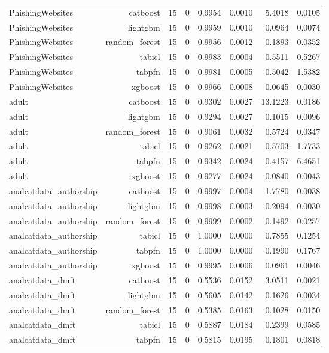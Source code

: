 \begin{table}[htbp]
\begin{tabular}{lrrrrrrr}
PhishingWebsites & catboost & 15 & 0 & 0.9954 & 0.0010 & 5.4018 & 0.0105 \\
PhishingWebsites & lightgbm & 15 & 0 & 0.9959 & 0.0010 & 0.0964 & 0.0074 \\
PhishingWebsites & random\_forest & 15 & 0 & 0.9956 & 0.0012 & 0.1893 & 0.0352 \\
PhishingWebsites & tabicl & 15 & 0 & 0.9983 & 0.0004 & 0.5511 & 0.5267 \\
PhishingWebsites & tabpfn & 15 & 0 & 0.9981 & 0.0005 & 0.5042 & 1.5382 \\
PhishingWebsites & xgboost & 15 & 0 & 0.9966 & 0.0008 & 0.0645 & 0.0030 \\
adult & catboost & 15 & 0 & 0.9302 & 0.0027 & 13.1223 & 0.0186 \\
adult & lightgbm & 15 & 0 & 0.9294 & 0.0027 & 0.1015 & 0.0096 \\
adult & random\_forest & 15 & 0 & 0.9061 & 0.0032 & 0.5724 & 0.0347 \\
adult & tabicl & 15 & 0 & 0.9262 & 0.0021 & 0.5703 & 1.7733 \\
adult & tabpfn & 15 & 0 & 0.9342 & 0.0024 & 0.4157 & 6.4651 \\
adult & xgboost & 15 & 0 & 0.9277 & 0.0024 & 0.0840 & 0.0043 \\
analcatdata\_authorship & catboost & 15 & 0 & 0.9997 & 0.0004 & 1.7780 & 0.0038 \\
analcatdata\_authorship & lightgbm & 15 & 0 & 0.9998 & 0.0003 & 0.2094 & 0.0030 \\
analcatdata\_authorship & random\_forest & 15 & 0 & 0.9999 & 0.0002 & 0.1492 & 0.0257 \\
analcatdata\_authorship & tabicl & 15 & 0 & 1.0000 & 0.0000 & 0.7855 & 0.1254 \\
analcatdata\_authorship & tabpfn & 15 & 0 & 1.0000 & 0.0000 & 0.1990 & 0.1767 \\
analcatdata\_authorship & xgboost & 15 & 0 & 0.9995 & 0.0006 & 0.0961 & 0.0046 \\
analcatdata\_dmft & catboost & 15 & 0 & 0.5536 & 0.0152 & 3.0511 & 0.0021 \\
analcatdata\_dmft & lightgbm & 15 & 0 & 0.5605 & 0.0142 & 0.1626 & 0.0034 \\
analcatdata\_dmft & random\_forest & 15 & 0 & 0.5385 & 0.0163 & 0.1028 & 0.0150 \\
analcatdata\_dmft & tabicl & 15 & 0 & 0.5887 & 0.0184 & 0.2399 & 0.0585 \\
analcatdata\_dmft & tabpfn & 15 & 0 & 0.5815 & 0.0195 & 0.1801 & 0.0818 \\

\end{tabular}
\end{table}
